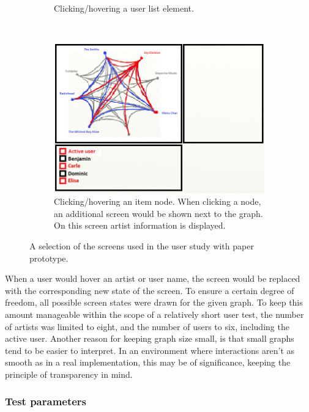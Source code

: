 \begin{figure}
\begin{subfigure}[t]{0.3\textwidth}
					\caption{Clicking/hovering a user list element.}
					\label{figure:paper_prototype_user_click}
	\end{subfigure}
	~
	\begin{subfigure}[t]{0.3\textwidth}
					\centering
					\includegraphics[width=\textwidth]{img/paper_prototype_item_click}
					\caption{Clicking/hovering an item node. When clicking a node, an additional screen would be shown next to the graph. On this screen artist information is displayed.}
					\label{figure:paper_prototype_item_click}
	\end{subfigure}
	\caption{A selection of the screens used in the user study with paper prototype.}%
	\label{figure:paper_prototype}%
\end{figure}

When a user would hover an artist or user name, the screen would be replaced with the corresponding new state of the screen. To ensure a certain degree of freedom, all possible screen states were drawn for the given graph. To keep this amount manageable within the scope of a relatively short user test, the number of artists was limited to eight, and the number of users to six, including the active user. Another reason for keeping graph size small, is that small graphs tend to be easier to interpret\cite{herman:2000}. In an environment where interactions aren't as smooth as in a real implementation, this may be of significance, keeping the principle of transparency in mind.


\subsubsection{Test parameters}\label{chapter:prototype:section:paper:setup}

